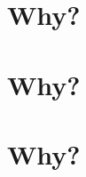 \documentclass{beamer}
\begin{document}

\section{Why?}

\begin{frame}[fragile]
\frametitle{\insertsection}

\end{frame}


\section{Why?}

\begin{frame}[fragile]
\frametitle{\insertsection}

\end{frame}


\section{Why?}

\begin{frame}[fragile]
\frametitle{\insertsection}

\end{frame}
\end{document}
